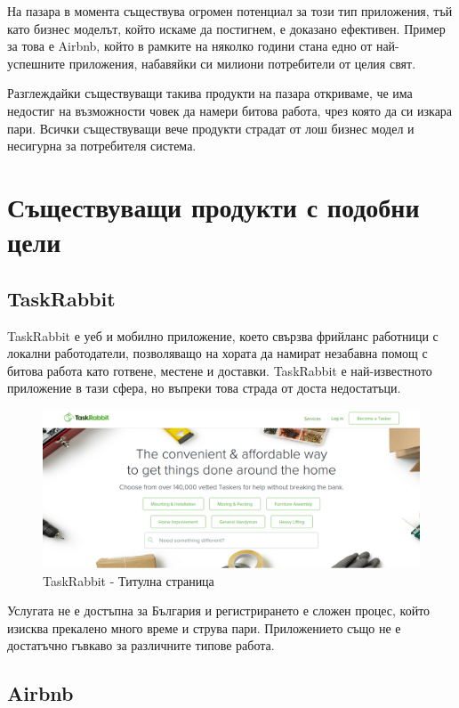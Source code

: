 На пазара в момента съществува огромен потенциал за този тип приложения, тъй като бизнес моделът, който искаме да постигнем, е доказано ефективен. Пример за това е Airbnb, който в рамките на няколко години стана едно от най-успешните приложения, набавяйки си милиони потребители от целия свят. 

Разглеждайки съществуващи такива продукти на пазара откриваме, че има недостиг на възможности човек да намери битова работа, чрез която да си изкара пари. Всички съществуващи вече продукти страдат от лош бизнес модел и несигурна за потребителя система. 
\section{Съществуващи продукти с подобни цели}
\subsection{TaskRabbit}
TaskRabbit е уеб и мобилно приложение, което свързва фрийланс работници с локални работодатели, позволяващо на хората да намират незабавна помощ с битова работа като готвене, местене и доставки. TaskRabbit е най-известното приложение в тази сфера, но въпреки това страда от доста недостатъци.
\begin{figure}[h]
    \centering
   \includegraphics[scale=.3]{images/taskRabbitWeb.png}
    \caption{TaskRabbit - Титулна страница}
    \label{fig:taskRabbitWeb}
\end{figure}

Услугата не е достъпна за България и регистрирането е сложен процес, който изисква прекалено много време и струва пари. Приложението също не е достатъчно гъвкаво за различните типове работа. 

\subsection{Airbnb}

